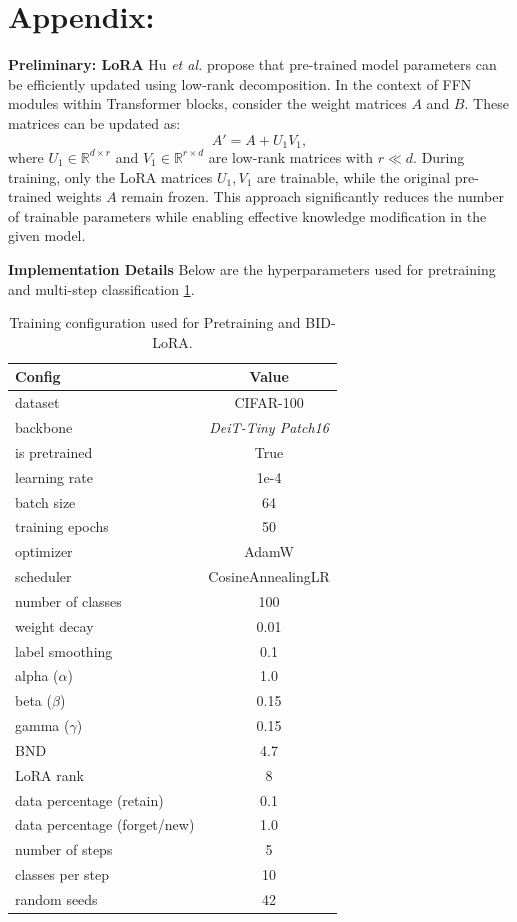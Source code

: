\section{Appendix:}
\textbf{Preliminary: LoRA}
Hu \textit{et al.} \cite{hu2022lora} propose that pre-trained model parameters can be efficiently updated using low-rank decomposition. In the context of FFN modules within Transformer blocks, consider the weight matrices $A$ and $B$. These matrices can be updated as:
\begin{equation}
A' = A + U_1V_1,
\end{equation}
where $U_1 \in \mathbb{R}^{d \times r}$ and $V_1 \in \mathbb{R}^{r \times d}$ are low-rank matrices with $r \ll d$. During training, only the LoRA matrices $U_1, V_1$ are trainable, while the original pre-trained weights $A$ remain frozen. This approach significantly reduces the number of trainable parameters while enabling effective knowledge modification in the given model.

\noindent
\textbf{Implementation Details}
Below are the hyperparameters used for pretraining and multi-step classification \ref{tab:impl-details-classification}.
\begin{table}[h!]
\centering
\begin{tabular}{l|c}
\textbf{Config} & \textbf{Value} \\
\hline
dataset           & CIFAR-100 \cite{krizhevsky2009learning} \\
backbone          & \textit{DeiT-Tiny Patch16} \cite{touvron2021training} \\
is pretrained     & True \\
learning rate     & 1e-4 \\
batch size        & 64 \\
training epochs   & 50 \\
optimizer         & AdamW \\
scheduler         & CosineAnnealingLR \\
number of classes & 100 \\
weight decay      & 0.01 \\
label smoothing   & 0.1 \\
alpha ($\alpha$)  & 1.0 \\
beta ($\beta$)  & 0.15 \\
gamma ($\gamma$)  & 0.15 \\
BND               & 4.7 \\
LoRA rank         & 8 \\
data percentage (retain) & 0.1 \\
data percentage (forget/new) & 1.0 \\
number of steps   & 5 \\
classes per step  & 10 \\
random seeds      & 42 \\
\end{tabular}
\caption{Training configuration used for Pretraining and BID-LoRA.}
\label{tab:impl-details-classification}
\end{table}


